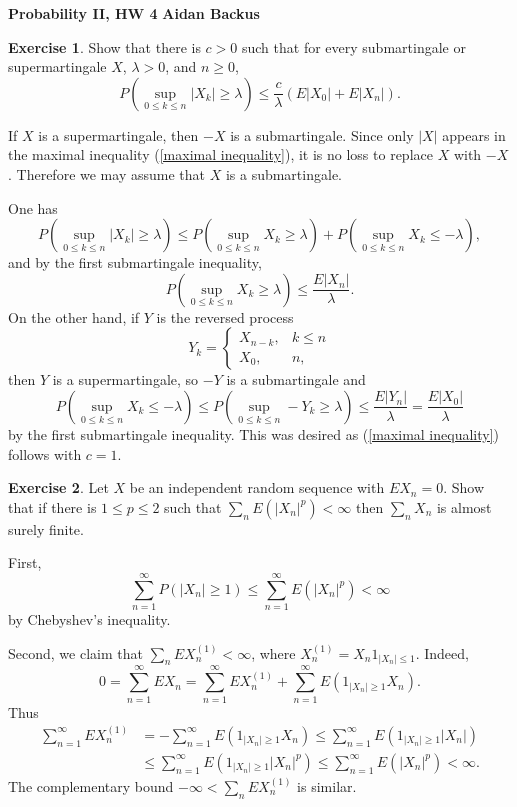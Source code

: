 \documentclass[10pt]{article}
\theoremstyle{definition}
\newtheorem{exer}{Exercise}
\begin{document}
\noindent
\large\textbf{Probability II, HW 4} \hfill \textbf{Aidan Backus} \\

\begin{exer}
Show that there is $c > 0$ such that for every submartingale or supermartingale $X$, $\lambda > 0$, and $n \geq 0$,
\begin{equation}
\label{maximal inequality}
P(\sup_{0 \leq k \leq n} |X_k| \geq \lambda) \leq \frac{c}{\lambda}(E|X_0| + E|X_n|).
\end{equation}
\end{exer}

If $X$ is a supermartingale, then $-X$ is a submartingale.
Since only $|X|$ appears in the maximal inequality (\ref{maximal inequality}), it is no loss to replace $X$ with $-X$.
Therefore we may assume that $X$ is a submartingale.

One has
$$P(\sup_{0 \leq k \leq n} |X_k| \geq \lambda) \leq P(\sup_{0 \leq k \leq n} X_k \geq \lambda) + P(\sup_{0 \leq k \leq n} X_k \leq -\lambda),$$
and by the first submartingale inequality,
$$P(\sup_{0 \leq k \leq n} X_k \geq \lambda) \leq \frac{E|X_n|}{\lambda}.$$
On the other hand, if $Y$ is the reversed process
$$Y_k = \begin{cases}
X_{n - k}, &k \leq n\\
X_0, &n,
\end{cases}$$
then $Y$ is a supermartingale, so $-Y$ is a submartingale and
$$P(\sup_{0 \leq k \leq n} X_k \leq -\lambda) \leq P(\sup_{0 \leq k \leq n} -Y_k \geq \lambda) \leq \frac{E|Y_n|}{\lambda} = \frac{E|X_0|}{\lambda}$$
by the first submartingale inequality.
This was desired as (\ref{maximal inequality}) follows with $c = 1$.

\begin{exer}
Let $X$ be an independent random sequence with $EX_n = 0$.
Show that if there is $1 \leq p \leq 2$ such that $\sum_n E(|X_n|^p) < \infty$ then $\sum_n X_n$ is almost surely finite.
\end{exer}

First,
$$\sum_{n=1}^\infty P(|X_n| \geq 1) \leq \sum_{n=1}^\infty E(|X_n|^p) < \infty$$
by Chebyshev's inequality.

Second, we claim that $\sum_n EX_n^{(1)} < \infty$, where $X_n^{(1)} = X_n 1_{|X_n| \leq 1}$.
Indeed,
$$0 = \sum_{n=1}^\infty EX_n = \sum_{n=1}^\infty EX_n^{(1)} + \sum_{n=1}^\infty E(1_{|X_n| \geq 1} X_n).$$
Thus
\begin{align*}
\sum_{n=1}^\infty EX_n^{(1)} &= -\sum_{n=1}^\infty E(1_{|X_n| \geq 1} X_n) \leq \sum_{n=1}^\infty E(1_{|X_n| \geq 1} |X_n|) \\
&\leq \sum_{n=1}^\infty E(1_{|X_n| \geq 1} |X_n|^p) \leq \sum_{n=1}^\infty E(|X_n|^p) < \infty.
\end{align*}
The complementary bound $-\infty < \sum_n EX_n^{(1)}$ is similar.
\end{document}
